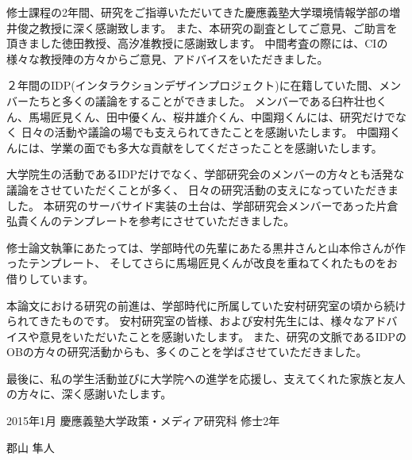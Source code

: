 \begin{acknowledgment}

修士課程の2年間、研究をご指導いただいてきた慶應義塾大学環境情報学部の増井俊之教授に深く感謝致します。
また、本研究の副査としてご意見、ご助言を頂きました徳田教授、高汐准教授に感謝致します。
中間考査の際には、CIの様々な教授陣の方々からご意見、アドバイスをいただきました。

２年間のIDP(インタラクションデザインプロジェクト)に在籍していた間、メンバーたちと多くの議論をすることができました。
メンバーである臼杵壮也くん、馬場匠見くん、田中優くん、桜井雄介くん、中園翔くんには、研究だけでなく
日々の活動や議論の場でも支えられてきたことを感謝いたします。
中園翔くんには、学業の面でも多大な貢献をしてくださったことを感謝いたします。

大学院生の活動であるIDPだけでなく、学部研究会のメンバーの方々とも活発な議論をさせていただくことが多く、
日々の研究活動の支えになっていただきました。
本研究のサーバサイド実装の土台は、学部研究会メンバーであった片倉弘貴くんのテンプレートを参考にさせていただきました。

修士論文執筆にあたっては、学部時代の先輩にあたる黒井さんと山本伶さんが作ったテンプレート、
そしてさらに馬場匠見くんが改良を重ねてくれたものをお借りしています。

本論文における研究の前進は、学部時代に所属していた安村研究室の頃から続けられてきたものです。
安村研究室の皆様、および安村先生には、様々なアドバイスや意見をいただいたことを感謝いたします。
また、研究の文脈であるIDPのOBの方々の研究活動からも、多くのことを学ばさせていただきました。

最後に、私の学生活動並びに大学院への進学を応援し、支えてくれた家族と友人の方々に、深く感謝いたします。

\begin{flushright}
2015年1月 慶應義塾大学政策・メディア研究科 修士2年

郡山 隼人
\end{flushright}



\end{acknowledgment}
